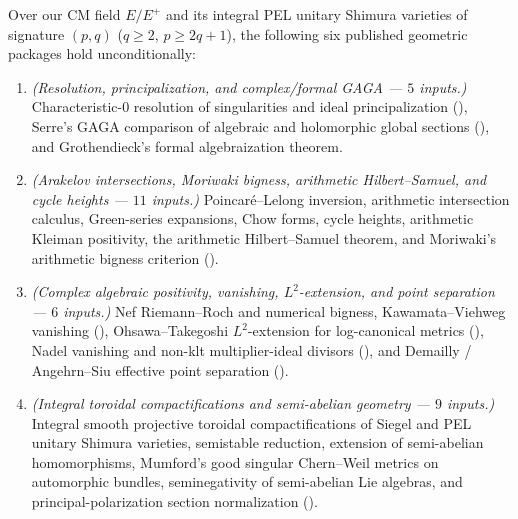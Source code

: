 \begin{proposition}
\label{prop:13:six-clusters}
Over our CM field $E/E^+$ and its integral PEL unitary Shimura varieties of signature $(p, q)$ ($q \ge 2$, $p \ge 2q + 1$), the following six published geometric packages hold unconditionally:
\begin{enumerate}[label=\textup{\textbf{Cluster~\Roman*.}}]
\item \emph{(Resolution, principalization, and complex/formal GAGA — $5$ inputs.)}
  Characteristic-$0$ resolution of singularities and ideal principalization (), Serre's GAGA comparison of algebraic and holomorphic global sections (), and Grothendieck's formal algebraization theorem.

\item \emph{(Arakelov intersections, Moriwaki bigness, arithmetic Hilbert--Samuel, and cycle heights — $11$ inputs.)}
  Poincar\'e--Lelong inversion, arithmetic intersection calculus, Green-series expansions, Chow forms, cycle heights, arithmetic Kleiman positivity, the arithmetic Hilbert--Samuel theorem, and Moriwaki's arithmetic bigness criterion ().

\item \emph{(Complex algebraic positivity, vanishing, $L^2$-extension, and point separation — $6$ inputs.)}
  Nef Riemann--Roch and numerical bigness, Kawamata--Viehweg vanishing (), Ohsawa--Takegoshi $L^2$-extension for log-canonical metrics (), Nadel vanishing and non-klt multiplier-ideal divisors (), and Demailly / Angehrn--Siu effective point separation ().

\item \emph{(Integral toroidal compactifications and semi-abelian geometry — $9$ inputs.)}
  Integral smooth projective toroidal compactifications of Siegel and PEL unitary Shimura varieties, semistable reduction, extension of semi-abelian homomorphisms, Mumford's good singular Chern--Weil metrics on automorphic bundles, seminegativity of semi-abelian Lie algebras, and principal-polarization section normalization ().


\end{enumerate}
\end{proposition}
